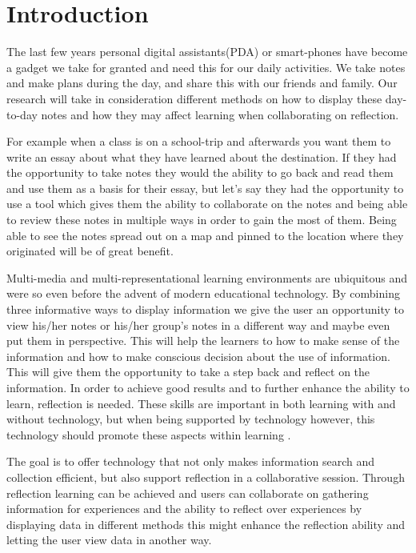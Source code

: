 \chapter{Introduction}
The last few years personal digital assistants(PDA) or smart-phones have become a gadget we take for granted and need this for our daily activities.  We take notes and make plans during the day, and share this with our friends and family. Our research will take in consideration different methods on how to display these day-to-day notes and how they may affect learning when collaborating on reflection.

For example when a class is on a school-trip and afterwards you want them to write an essay about what they have learned about the destination. If they had the opportunity to take notes they would the ability to go back and read them and use them as a basis for their essay, but let’s say they had the opportunity to use a tool which gives them the ability to collaborate on the notes and being able to review these notes in multiple ways in order to gain the most of them. Being able to see the notes spread out on a map and pinned to the location where they originated will be of great benefit.

Multi-media and multi-representational learning environments are ubiquitous and were so even before the advent of modern educational technology.\cite{Ainsworth1999} By combining three informative ways to display information we give the user an opportunity to view his/her notes or his/her group’s notes in a different way and maybe even put them in perspective. This will help the learners to how to make sense of the information and how to make conscious decision about the use of information. This will give them the opportunity to take a step back and reflect on the information. In order to achieve good results and to further enhance the ability to learn, reflection is needed. These skills are important in both learning with and without technology, but when being supported by technology however, this technology should promote these aspects within learning \cite{Lin1999}.

The goal is to offer technology that not only makes information search and collection efficient, but also support reflection in a collaborative session. Through reflection learning can be achieved and users can collaborate on gathering information for experiences and the ability to reflect over experiences by displaying data in different methods this might enhance the reflection ability and letting the user view data in another way.